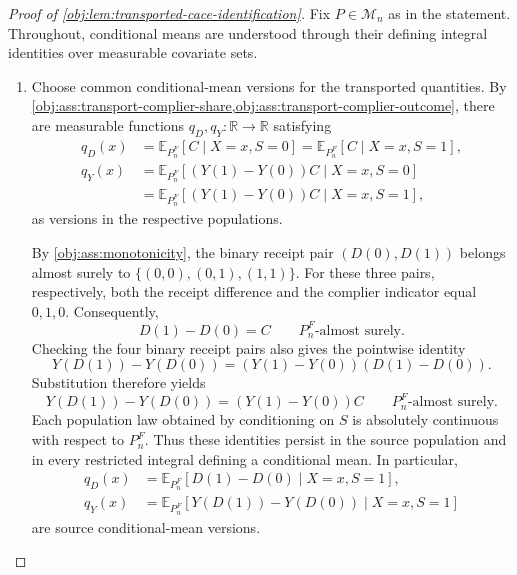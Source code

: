 \begin{proof}[Proof of \cref{obj:lem:transported-cace-identification}]
Fix \(P\in\mathcal M_n\) as in the statement. Throughout, conditional means are understood through their defining integral identities over measurable covariate sets.

\begin{enumerate}
\item Choose common conditional-mean versions for the transported quantities. By \cref{obj:ass:transport-complier-share,obj:ass:transport-complier-outcome}, there are measurable functions \(q_D,q_Y:\mathbb R\to\mathbb R\) satisfying
\[
\begin{aligned}
q_D(x)
&=\mathbb E_{P_n^F}[C\mid X=x,S=0]
 =\mathbb E_{P_n^F}[C\mid X=x,S=1],\\
q_Y(x)
&=\mathbb E_{P_n^F}[(Y(1)-Y(0))C\mid X=x,S=0]\\
&=\mathbb E_{P_n^F}[(Y(1)-Y(0))C\mid X=x,S=1],
\end{aligned}
\]
as versions in the respective populations.

By \cref{obj:ass:monotonicity}, the binary receipt pair
\((D(0),D(1))\) belongs almost surely to
\(\{(0,0),(0,1),(1,1)\}\). For these three pairs, respectively, both the receipt difference and the complier indicator equal \(0,1,0\). Consequently,
\[
D(1)-D(0)=C
\qquad P_n^F\text{-almost surely}.
\]
Checking the four binary receipt pairs also gives the pointwise identity
\[
Y(D(1))-Y(D(0))
=(Y(1)-Y(0))(D(1)-D(0)).
\]
Substitution therefore yields
\[
Y(D(1))-Y(D(0))=(Y(1)-Y(0))C
\qquad P_n^F\text{-almost surely}.
\]
Each population law obtained by conditioning on \(S\) is absolutely continuous with respect to \(P_n^F\). Thus these identities persist in the source population and in every restricted integral defining a conditional mean. In particular,
\[
\begin{aligned}
q_D(x)&=\mathbb E_{P_n^F}[D(1)-D(0)\mid X=x,S=1],\\
q_Y(x)&=\mathbb E_{P_n^F}[Y(D(1))-Y(D(0))\mid X=x,S=1]
\end{aligned}
\]
are source conditional-mean versions.


\end{enumerate}
\end{proof}
